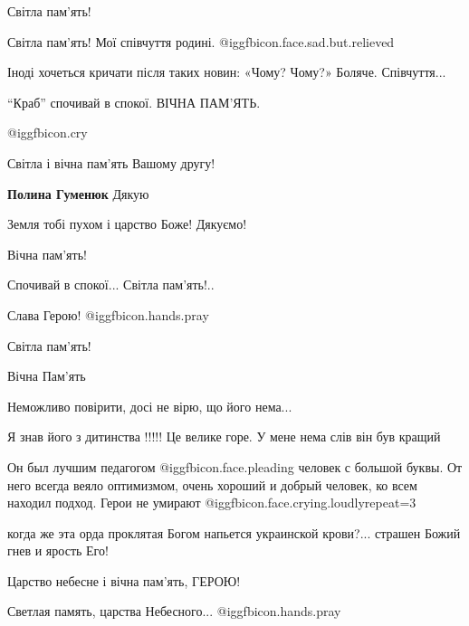 \begin{itemize}
Світла пам'ять!

Світла пам'ять! Мої співчуття родині.  @igg{fbicon.face.sad.but.relieved} 

Іноді хочеться кричати після таких новин: «Чому? Чому?» Боляче. Співчуття...

\enquote{Краб} спочивай в спокої. ВІЧНА ПАМ'ЯТЬ.

 @igg{fbicon.cry} 

Світла і вічна пам'ять Вашому другу!

\textbf{Полина Гуменюк} Дякую

Земля тобі пухом і царство Боже! Дякуємо!

Вічна пам'ять!

Спочивай в спокої... Світла пам'ять!..

Слава Герою! @igg{fbicon.hands.pray} 

Світла пам'ять!

Вічна Пам'ять

Неможливо повірити, досі не вірю, що його нема...

Я знав його з дитинства !!!!! Це велике горе. У мене нема слів він був кращий


Он был лучшим педагогом  @igg{fbicon.face.pleading} человек с большой буквы. От него всегда веяло
оптимизмом, очень хороший и добрый человек, ко всем находил подход. Герои не
умирают  @igg{fbicon.face.crying.loudly}{repeat=3} 

когда же эта орда проклятая Богом напьется украинской крови?... страшен Божий гнев и ярость Его!

Царство небесне і вічна пам'ять, ГЕРОЮ!

Светлая память, царства Небесного... @igg{fbicon.hands.pray} 


\end{itemize} %
